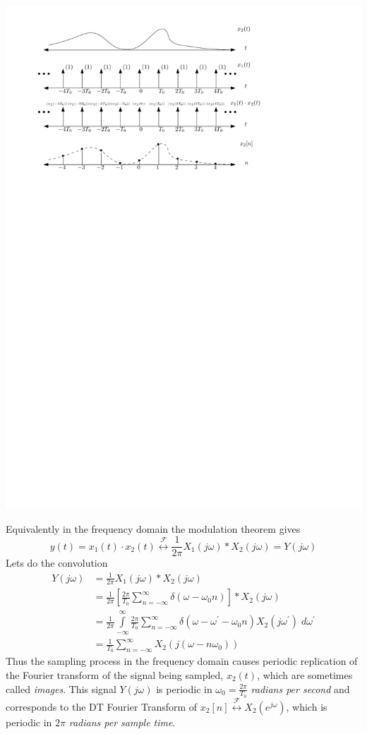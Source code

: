\begin{center}
  \includegraphics[scale=1]{graphics/samplinf_timedomain.pdf}
\end{center}

Equivalently in the frequency domain the modulation theorem gives
\[
y(t) = x_1(t) \cdot x_2(t) \stackrel{\mathcal{F}}{\longleftrightarrow} \frac{1}{2\pi} X_1(j\omega) * X_2(j\omega) = Y(j\omega)
\]
Lets do the convolution
\begin{align*}
  Y(j\omega) &= \frac{1}{2\pi} X_1(j\omega) * X_2(j\omega)\\
  &=  \frac{1}{2\pi} \left[  \frac{2\pi}{T_0} \sum\limits_{n=-\infty}^{\infty} \delta(\omega - \omega_0 n) \right] * X_2(j\omega)\\
  &= \frac{1}{2\pi} \int\limits_{-\infty}^{\infty}  \frac{2\pi}{T_0} \sum\limits_{n=-\infty}^{\infty} \delta(\omega - \omega^\prime - \omega_0 n) X_2(j\omega^\prime) \; d\omega^\prime\\
  &= \frac{1}{T_0} \sum\limits_{n=-\infty}^{\infty} X_2(j(\omega - n\omega_0)) 
\end{align*}
Thus the sampling process in the frequency domain causes periodic replication of the Fourier transform of the signal being sampled, $x_2(t)$, which are sometimes called \emph{images}. This signal $Y(j\omega)$ is periodic in $\omega_0 = \tfrac{2\pi}{T_0}$ \emph{radians per second} and corresponds to the DT Fourier Transform of $x_2[n]  \stackrel{\mathcal{F}}{\longleftrightarrow} X_2\left(e^{j\omega}\right)$, which is periodic in $2\pi$ \emph{radians per sample time}.

